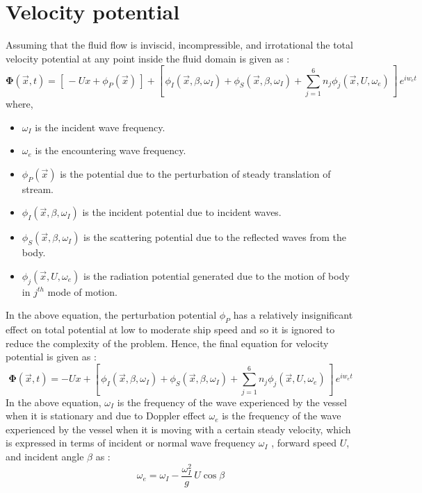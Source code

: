 \section{Velocity potential}
Assuming that the fluid flow is inviscid, incompressible, and irrotational the total velocity potential at any point inside the fluid domain is given as :
\begin{equation}
    \boldsymbol{\Phi} (\vec{x}, t) = [\, -Ux + \phi_P(\vec{x})\,] + [\, \phi_I(\vec{x}, \beta, \omega_I) + \phi_S(\vec{x}, \beta, \omega_I) + \sum_{j=1}^{6}n_j\phi_j(\vec{x}, U, \omega_e) \,]\, e^{i w_e t}
\end{equation}
where, 
\begin{itemize}
    \item $\omega_I$ is the incident wave frequency.
    \item $\omega_e$ is the encountering wave frequency.
    \item $\phi_P(\vec{x})$ is the potential due to the perturbation of steady translation of stream.
    \item $\phi_I(\vec{x}, \beta, \omega_I)$ is the incident potential due to incident waves.
    \item $\phi_S(\vec{x}, \beta, \omega_I)$ is the scattering potential due to the reflected 
    waves from the body.
    \item $\phi_j(\vec{x}, U, \omega_e)$ is the radiation potential generated due to the
    motion of body in $j^{th}$ mode of motion.
\end{itemize}
In the above equation, the perturbation potential $\phi_P$ has a relatively insignificant 
effect on total 
potential at low to moderate ship speed and so it is ignored to reduce the complexity 
of the problem. Hence, the final equation for velocity potential is given as :
\begin{equation}
    \label{eq:velocity_potential}
    \boldsymbol{\Phi} (\vec{x}, t) = -Ux + [\, \phi_I(\vec{x}, \beta, \omega_I) + \phi_S(\vec{x}, 
    \beta, \omega_I) + \sum_{j=1}^{6}n_j\phi_j(\vec{x}, U, \omega_e) \,]\, e^{i w_e t}
\end{equation}
In the above equation, $\omega_I$ is the 
frequency of the wave experienced by the vessel when it is stationary and due to Doppler effect
$\omega_e$ is the frequency of the wave experienced by the vessel when it is moving with a 
certain steady velocity, which is expressed in terms of incident or normal wave 
frequency $\omega_I$ , forward speed $U$, and incident angle $\beta$ as :
\begin{equation}
    \label{eq:omega}
    \omega_e = \omega_I - \frac{\omega_I^2}{g}\,U\cos\beta
\end{equation}


